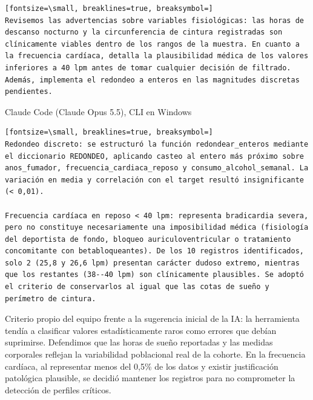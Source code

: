 \documentclass[12pt,a4paper,oneside]{book}
\begin{document}
\begin{iaprompt}
\begin{Verbatim}[fontsize=\small, breaklines=true, breaksymbol=]
Revisemos las advertencias sobre variables fisiológicas: las horas de descanso nocturno y la circunferencia de cintura registradas son clínicamente viables dentro de los rangos de la muestra. En cuanto a la frecuencia cardíaca, detalla la plausibilidad médica de los valores inferiores a 40 lpm antes de tomar cualquier decisión de filtrado. Además, implementa el redondeo a enteros en las magnitudes discretas pendientes.
\end{Verbatim}
\end{iaprompt}
\begin{iaresp}{Claude Code (Claude Opus 5.5), CLI en Windows}
\begin{Verbatim}[fontsize=\small, breaklines=true, breaksymbol=]
Redondeo discreto: se estructuró la función redondear_enteros mediante el diccionario REDONDEO, aplicando casteo al entero más próximo sobre anos_fumador, frecuencia_cardiaca_reposo y consumo_alcohol_semanal. La variación en media y correlación con el target resultó insignificante (< 0,01).

Frecuencia cardíaca en reposo < 40 lpm: representa bradicardia severa, pero no constituye necesariamente una imposibilidad médica (fisiología del deportista de fondo, bloqueo auriculoventricular o tratamiento concomitante con betabloqueantes). De los 10 registros identificados, solo 2 (25,8 y 26,6 lpm) presentan carácter dudoso extremo, mientras que los restantes (38--40 lpm) son clínicamente plausibles. Se adoptó el criterio de conservarlos al igual que las cotas de sueño y perímetro de cintura.
\end{Verbatim}
\end{iaresp}
\begin{iaanalisis}
Criterio propio del equipo frente a la sugerencia inicial de la IA: la herramienta tendía a clasificar valores estadísticamente raros como errores que debían suprimirse. Defendimos que las horas de sueño reportadas y las medidas corporales reflejan la variabilidad poblacional real de la cohorte. En la frecuencia cardíaca, al representar menos del 0,5\% de los datos y existir justificación patológica plausible, se decidió mantener los registros para no comprometer la detección de perfiles críticos.
\end{iaanalisis}
\end{document}
